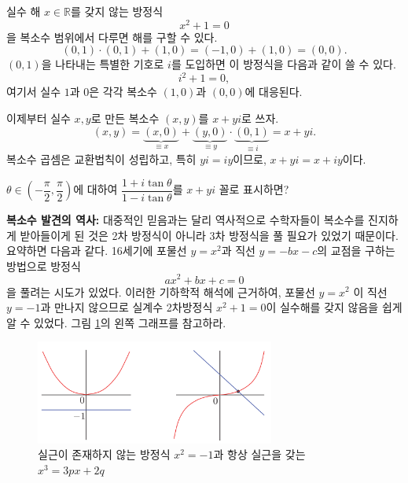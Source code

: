 실수 해 $x\in\mathbb R$를 갖지 않는 방정식
$$
x^2+1=0
$$
을 복소수 범위에서 다루면 해를 구할 수 있다.
$$
(0,1)\cdot (0,1) + (1,0) = (-1,0) + (1,0) = (0,0).
$$
$(0,1)$을 나타내는 특별한 기호로 $i$를 도입하면 이 방정식을 다음과 같이 쓸 수 있다.
$$
i^2+1=0,
$$
여기서 실수 $1$과 $0$은 각각 복소수 $(1,0)$과 $(0,0)$에 대응된다.

이제부터 실수  $x,y$로 만든 복소수 $(x,y)$를 $x+yi$로 쓰자.
$$
(x,y) = \underbrace{(x,0)}_{\equiv x} +  \underbrace{(y,0)}_{\equiv y}
\cdot  \underbrace{(0,1)}_{\equiv i} = x+yi.
$$
복소수 곱셈은 교환법칙이 성립하고, 특히 $yi = iy$이므로,
$x+yi = x+iy$이다.

\begin{salt_exercise} \label{ex-1-2}
$\theta \in \left(-\dfrac{\pi}2, \dfrac\pi2 \right)$에 대하여
$\dfrac{1+i\tan\theta}{1-i\tan\theta}$를 $x+yi$ 꼴로 표시하면?
\end{salt_exercise}

{\bf 복소수 발견의 역사: }
대중적인 믿음과는 달리 역사적으로 수학자들이 복소수를 진지하게 받아들이게 된 것은 
2차 방정식이 아니라 3차 방정식을 풀 필요가 있었기 때문이다. 
요약하면 다음과 같다.
16세기에 포물선 $y=x^2$과 직선 $y=-bx-c$의 교점을 구하는  방법으로 
 방정식
$$
ax^2 + bx + c = 0
$$
을 풀려는 시도가 있었다. 
이러한 기하학적 해석에 근거하여,
포물선  $y=x^2$ 이 직선 $y=-1$과 만나지 않으므로
실계수 2차방정식 $x^2+1=0$이 실수해를 갖지 않음을 쉽게 알 수 있었다.
그림 \ref{fig-1-1}의 왼쪽 그래프를 참고하라.

\begin{figure}[!h]
\begin{center}
\includegraphics[width=0.7\textwidth]{./SaltChapter/figs/fig-1-1}
\end{center}
\caption{실근이 존재하지 않는 방정식 $x^2=-1$과 항상 실근을 갖는 $x^3=3px+2q$}
\label{fig-1-1}
\end{figure}

